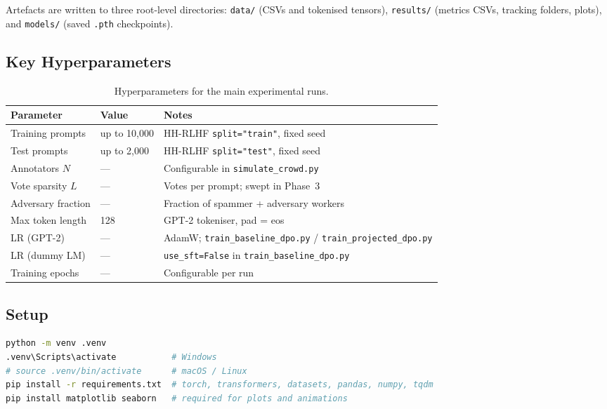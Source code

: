 \documentclass[11pt, a4paper]{article}
\begin{document}
Artefacts are written to three root-level directories: \texttt{data/} (CSVs and tokenised
tensors), \texttt{results/} (metrics CSVs, tracking folders, plots), and \texttt{models/}
(saved \texttt{.pth} checkpoints).

\subsection{Key Hyperparameters}

\begin{table}[H]
  \centering
  \caption{Hyperparameters for the main experimental runs.}
  \label{tab:hparams}
  \begin{tabular}{lll}
    \toprule
    \textbf{Parameter} & \textbf{Value} & \textbf{Notes} \\
    \midrule
    Training prompts      & up to 10,000   & HH-RLHF \texttt{split="train"}, fixed seed \\
    Test prompts          & up to 2,000    & HH-RLHF \texttt{split="test"}, fixed seed \\
    Annotators $N$        & ---            & Configurable in \texttt{simulate\_crowd.py} \\
    Vote sparsity $L$     & ---            & Votes per prompt; swept in Phase~3 \\
    Adversary fraction    & ---            & Fraction of spammer + adversary workers \\
    Max token length      & 128            & GPT-2 tokeniser, pad = eos \\
    LR (GPT-2)            & ---            & AdamW; \texttt{train\_baseline\_dpo.py} / \texttt{train\_projected\_dpo.py} \\
    LR (dummy LM)         & ---            & \texttt{use\_sft=False} in \texttt{train\_baseline\_dpo.py} \\
    Training epochs       & ---            & Configurable per run \\
    \bottomrule
  \end{tabular}
\end{table}

\subsection{Setup}

\begin{lstlisting}[language=bash, caption={Environment setup}]
python -m venv .venv
.venv\Scripts\activate           # Windows
# source .venv/bin/activate      # macOS / Linux
pip install -r requirements.txt  # torch, transformers, datasets, pandas, numpy, tqdm
pip install matplotlib seaborn   # required for plots and animations
\end{lstlisting}
\end{document}
